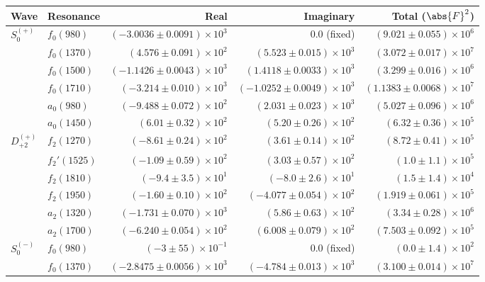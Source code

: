 \begin{table}[ht]
    \begin{center}
        \begin{tabular}{llrrr}\toprule
        Wave & Resonance & Real & Imaginary & Total ($\abs{F}^2$) \\\midrule
$S_{0}^{(+)}$ & $f_{0}(980)$ & $(-3.0036 \pm 0.0091) \times 10^{3}$ & $0.0$ (fixed) & $(9.021 \pm 0.055) \times 10^{6}$ \\
 & $f_{0}(1370)$ & $(4.576 \pm 0.091) \times 10^{2}$ & $(5.523 \pm 0.015) \times 10^{3}$ & $(3.072 \pm 0.017) \times 10^{7}$ \\
 & $f_{0}(1500)$ & $(-1.1426 \pm 0.0043) \times 10^{3}$ & $(1.4118 \pm 0.0033) \times 10^{3}$ & $(3.299 \pm 0.016) \times 10^{6}$ \\
 & $f_{0}(1710)$ & $(-3.214 \pm 0.010) \times 10^{3}$ & $(-1.0252 \pm 0.0049) \times 10^{3}$ & $(1.1383 \pm 0.0068) \times 10^{7}$ \\
 & $a_{0}(980)$ & $(-9.488 \pm 0.072) \times 10^{2}$ & $(2.031 \pm 0.023) \times 10^{3}$ & $(5.027 \pm 0.096) \times 10^{6}$ \\
 & $a_{0}(1450)$ & $(6.01 \pm 0.32) \times 10^{2}$ & $(5.20 \pm 0.26) \times 10^{2}$ & $(6.32 \pm 0.36) \times 10^{5}$ \\
$D_{+2}^{(+)}$ & $f_{2}(1270)$ & $(-8.61 \pm 0.24) \times 10^{2}$ & $(3.61 \pm 0.14) \times 10^{2}$ & $(8.72 \pm 0.41) \times 10^{5}$ \\
 & $f_{2}'(1525)$ & $(-1.09 \pm 0.59) \times 10^{2}$ & $(3.03 \pm 0.57) \times 10^{2}$ & $(1.0 \pm 1.1) \times 10^{5}$ \\
 & $f_{2}(1810)$ & $(-9.4 \pm 3.5) \times 10^{1}$ & $(-8.0 \pm 2.6) \times 10^{1}$ & $(1.5 \pm 1.4) \times 10^{4}$ \\
 & $f_{2}(1950)$ & $(-1.60 \pm 0.10) \times 10^{2}$ & $(-4.077 \pm 0.054) \times 10^{2}$ & $(1.919 \pm 0.061) \times 10^{5}$ \\
 & $a_{2}(1320)$ & $(-1.731 \pm 0.070) \times 10^{3}$ & $(5.86 \pm 0.63) \times 10^{2}$ & $(3.34 \pm 0.28) \times 10^{6}$ \\
 & $a_{2}(1700)$ & $(-6.240 \pm 0.054) \times 10^{2}$ & $(6.008 \pm 0.079) \times 10^{2}$ & $(7.503 \pm 0.092) \times 10^{5}$ \\
$S_{0}^{(-)}$ & $f_{0}(980)$ & $(-3 \pm 55) \times 10^{-1}$ & $0.0$ (fixed) & $(0.0 \pm 1.4) \times 10^{2}$ \\
 & $f_{0}(1370)$ & $(-2.8475 \pm 0.0056) \times 10^{3}$ & $(-4.784 \pm 0.013) \times 10^{3}$ & $(3.100 \pm 0.014) \times 10^{7}$ \\

\end{tabular}
\end{center}
\end{table}
